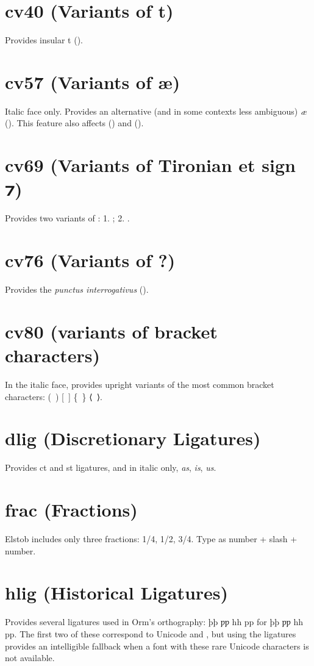 \documentclass[12pt,letterpaper,openany]{book}
\begin{document}
\section{cv40 (Variants of t)}
Provides insular t ().

\section{cv57 (Variants of æ)}
Italic face only. Provides an alternative (and in some contexts less ambiguous)
\textit{æ} (\textit{}).
This feature also affects  (\textit{})
and  (\textit{}).

\section{cv69 (Variants of Tironian et sign ⁊)}
Provides two variants of : 1. ; 2. .

\section{cv76 (Variants of ?)}
Provides the \textit{punctus interrogativus} ().

\section{cv80 (variants of bracket characters)}
In the italic face, provides upright variants of the most common bracket
characters: (\ ) [\ ] \{\ \} ⟨\ ⟩.

\section{dlig (Discretionary Ligatures)}
Provides { ct} and
{ st} ligatures, and in italic only,
{ \textit{as}, \textit{is}, \textit{us}}.

\section{frac (Fractions)}
Elstob includes only three fractions: { 1/4, 1/2,
3/4}. Type as number + slash + number.

\section{hlig (Historical Ligatures)}
Provides several ligatures used in Orm’s orthography:
{ þþ ƿƿ hh pp} for
{þþ ƿƿ hh pp}. The first two of these correspond
to Unicode  and , but using the ligatures provides an intelligible
fallback when a font with these rare Unicode characters is not available.
\end{document}
